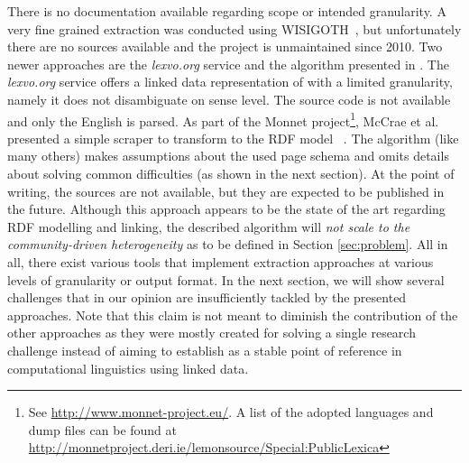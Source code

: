 There is no documentation available regarding scope or intended granularity. 
A very fine grained extraction was conducted using WISIGOTH~\cite{sajous_2010}, but unfortunately there are no sources available and the project is unmaintained since 2010. 
Two newer approaches are the \textit{lexvo.org} service and the algorithm presented in \cite{McCrae_2012}.
The \textit{lexvo.org} service offers a linked data representation of \wik with a limited granularity, namely it does not disambiguate on sense level. 
The source code is not available and only the English \wik is parsed.
As part of the Monnet project\footnote{See \url{http://www.monnet-project.eu/}. A list of the adopted languages and dump files can be found at \url{http://monnetproject.deri.ie/lemonsource/Special:PublicLexica}}, McCrae et al.~\cite{McCrae_2012} presented a simple scraper to transform \wik to the \lemon RDF model~ \cite{lemon-eswc}.
The algorithm (like many others) makes assumptions about the used page schema and omits details about solving common difficulties (as shown in the next section). 
At the point of writing, the sources are not available, but they are expected to be published in the future. 
Although this approach appears to be the state of the art regarding RDF modelling and linking, the described algorithm will \textit{not scale to the community-driven heterogeneity} as to be defined in Section \ref{sec:problem}.
All in all, there exist various tools that implement extraction approaches at various levels of granularity or output format. 
In the next section, we will show several challenges that in our opinion are insufficiently tackled by the presented approaches. 
Note that this claim is not meant to diminish the contribution of the other approaches as they were mostly created for solving a single research challenge instead of aiming to establish \wik as a stable point of reference in computational linguistics using linked data.
\newpage
